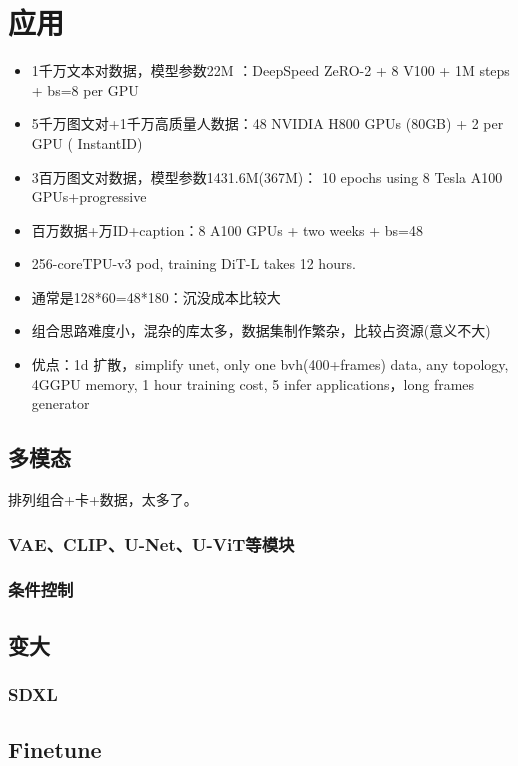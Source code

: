 \documentclass[lang=cn,newtx,10pt,scheme=chinese]{elegantbook}
\begin{document}
\section{应用}
\begin{itemize}
    \item 1千万文本对数据，模型参数22M ：DeepSpeed ZeRO-2 +  8 V100 + 1M steps + bs=8 per GPU
    \item 5千万图文对+1千万高质量人数据：48 NVIDIA H800 GPUs (80GB) + 2 per GPU ( InstantID)
    \item 3百万图文对数据，模型参数1431.6M(367M)： 10 epochs using 8 Tesla A100 GPUs+progressive 
    \item 百万数据+万ID+caption：8 A100 GPUs + two weeks + bs=48
    \item 256-coreTPU-v3 pod, training DiT-L takes 12 hours.
    \item 通常是128*60=48*180：沉没成本比较大
    \item 组合思路难度小，混杂的库太多，数据集制作繁杂，比较占资源(意义不大)
    \item 优点：1d 扩散，simplify unet, only one bvh(400+frames) data, any topology,  4GGPU memory, 1 hour training cost, 5 infer applications，long frames generator
\end{itemize}

\subsection{多模态}

排列组合+卡+数据，太多了。

\subsubsection{VAE、CLIP、U-Net、U-ViT等模块}
\subsubsection{条件控制}

\subsection{变大}
\subsubsection{SDXL}
\subsection{Finetune}
\end{document}
